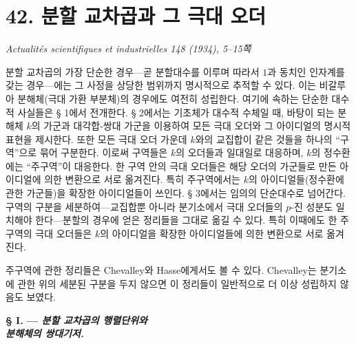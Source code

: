 
\section*{42. 분할 교차곱과 그 극대 오더}

\begin{center}
\emph{Actualités scientifiques et industrielles 148 (1934), 5--15쪽}
\end{center}

분할 교차곱의 가장 단순한 경우---곧 분할대수를 이루며 따라서 $1$과 동치인 인자계를 갖는 경우---에는 그 사정을 상당한 범위까지 명시적으로 추적할 수 있다. 이는 비갈루아 분해체(극대 가환 부분체)의 경우에도 여전히 성립한다. 여기에 속하는 단순한 대수적 사실들은 § 1에서 전개한다. § 2에서는 기초체가 대수적 수체일 때, 바탕이 되는 분해체 $k$의 가군과 대각합-쌍대 가군을 이용하여 모든 극대 오더와 그 아이디얼의 명시적 표현을 제시한다. 또한 모든 극대 오더 가운데 $k$와의 교집합이 같은 것들을 하나의 ``구역''으로 묶어 구분한다. 이로써 구역들은 $k$의 오더들과 일대일로 대응하며, $k$의 정수환에는 ``주구역''이 대응한다. 한 구역 안의 극대 오더들은 해당 오더의 가군들로 만든 아이디얼에 의한 변환으로 서로 옮겨진다. 특히 주구역에서는 $k$의 아이디얼들(정수환에 관한 가군들)을 확장한 아이디얼들이 쓰인다. § 3에서는 임의의 단순대수로 넘어간다. 구역의 구분을 세분하여---교집합뿐 아니라 분기소에서 극대 오더들의 $p$-진 성분도 일치해야 한다---분할의 경우에 얻은 정리들을 그대로 옮길 수 있다. 특히 이때에도 한 주구역의 극대 오더들은 $k$의 아이디얼을 확장한 아이디얼들에 의한 변환으로 서로 옮겨진다.

주구역에 관한 정리들은 Chevalley와 Hasse에게서도 볼 수 있다. Chevalley는 분기소에 관한 위의 세분된 구분을 두지 않으면 이 정리들이 일반적으로 더 이상 성립하지 않음도 보였다.

\begin{center}
\textbf{§ I. --- \emph{분할 교차곱의 행렬단위와\\
분해체의 쌍대기저.}}
\end{center}
